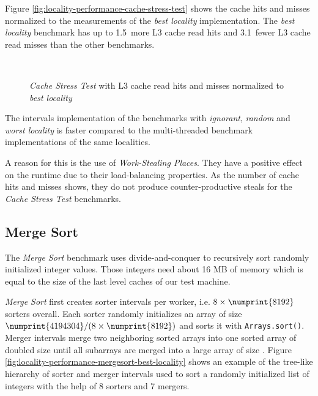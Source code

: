 Figure \ref{fig:locality-performance-cache-stress-test} shows the
cache hits and misses normalized to the measurements of the \emph{best
  locality} implementation. The \emph{best locality} benchmark has up
to 1.5\texttimes\ more L3 cache read hits and 3.1\texttimes\ fewer L3
cache read misses than the other benchmarks.

\begin{figure}[!ht]
  \centering
  \\
  \caption[\emph{Cache Stress Test} L3 cache read hits and
  misses]{\emph{Cache Stress Test} with L3 cache read hits and misses
    normalized to \emph{best locality}}
  \label{fig:locality-performance-cache-stress-test-cache}
\end{figure}

The intervals implementation of the benchmarks with \emph{ignorant},
\emph{random} and \emph{worst locality} is faster compared to the
multi-threaded benchmark implementations of the same
localities. 

A reason for this is the use of \emph{Work-Stealing Places}. They have
a positive effect on the runtime due to their load-balancing
properties. As the number of cache hits and misses shows, they do not
produce counter-productive steals for the \emph{Cache Stress Test}
benchmarks.

\subsection{Merge Sort}
\label{sec:locality-performance-merge-sort}

The \emph{Merge Sort} benchmark uses divide-and-conquer to recursively
sort  randomly initialized integer values. Those
integers need about 16 MB of memory which is equal to the size of the
last level caches of our test machine.

\emph{Merge Sort} first creates  sorter intervals per
worker, i.e. $8 \times \numprint{8192}$ sorters overall. Each sorter
randomly initializes an array of size $\numprint{4194304} / (8 \times
\numprint{8192})$ and sorts it with \lstinline!Arrays.sort()!. Merger
intervals merge two neighboring sorted arrays into one sorted array of
doubled size until all subarrays are merged into a large array of size
. Figure
\ref{fig:locality-performance-mergesort-best-locality} shows an
example of the tree-like hierarchy of sorter and merger intervals used
to sort a randomly initialized list of integers with the help of 8
sorters and 7 mergers.

